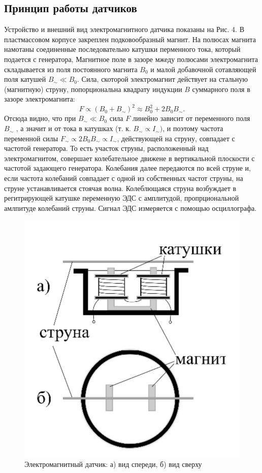 \documentclass[a4paper,12pt]{article} %
\begin{document}
\subsection{Принцип работы датчиков}
Устройство и внешний вид электромагнитного датчика показаны на Рис. 4. В пластмассовом корпусе закреплен подковообразный магнит. На полюсах магнита намотаны соединенные последовательно катушки перменного тока, который подается с генератора, Магнитное поле в зазоре мжеду полюсами электромагнита складывается из поля постоянного магнита $B_0$ и малой добавочной сотавляющей поля катушей $B_\sim \ll B_0$. Сила, скоторой электромагнит действует на стальную (магнитную) струну, попорциональна квадрату индукции $B$ суммарного поля в зазоре электромагнита:
\[F \propto (B_0+B_\sim)^2 \approx B_0^2 + 2B_0B_\sim.\]
Отсюда видно, что при $B_\sim \ll B_0$ сила $F$ линейно зависит от переменного поля $B_\sim$ , а значит и от тока в катушках (т. к. $B_\sim \propto I_\sim)$, и поэтому частота переменной силы $F_\sim \propto 2B_0B_\sim \propto I_\sim$, действующей на струну, совпадает с частотой генератора. То есть участок струны, расположенный над электромагнитом, совершает колебательное движене в вертикальной плоскости с частотой задающего генератора. Колебания далее передаются по всей струне и, если частота колебаний совпадает с одной из собственных частот струны, на струне устанавливается стоячая волна. Колеблющаяся струна возбуждает в регитрирующей катушке переменную ЭДС с амплитудой, пропрциональной амлпитуде колебаний струны. Сигнал ЭДС измеряется с помощью осциллографа.
\begin{figure}[h]
\centering
\includegraphics[scale=0.4]{6}
\caption{Электромагнитный датчик: а) вид спереди, б) вид сверху}
\end{figure}
\end{document}
